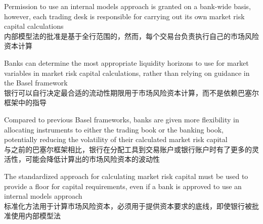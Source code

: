 \documentclass{article}
\begin{document}
\begin{choices}
    \item Permission to use an internal models approach is granted on a bank-wide basis, however, each trading desk is responsible for carrying out its own market risk capital calculations\\
    内部模型法的批准是基于全行范围的，然而，每个交易台负责执行自己的市场风险资本计算
    \item Banks can determine the most appropriate liquidity horizons to use for market variables in market risk capital calculations, rather than relying on guidance in the Basel framework\\
    银行可以自行决定最合适的流动性期限用于市场风险资本计算，而不是依赖巴塞尔框架中的指导
    \item Compared to previous Basel frameworks, banks are given more flexibility in allocating instruments to either the trading book or the banking book, potentially reducing the volatility of their calculated market risk capital\\
    与之前的巴塞尔框架相比，银行在分配工具到交易账户或银行账户时有了更多的灵活性，可能会降低计算出的市场风险资本的波动性
    \item The standardized approach for calculating market risk capital must be used to provide a floor for capital requirements, even if a bank is approved to use an internal models approach\\
    标准化方法用于计算市场风险资本，必须用于提供资本要求的底线，即使银行被批准使用内部模型法
\end{choices}
\end{document}
